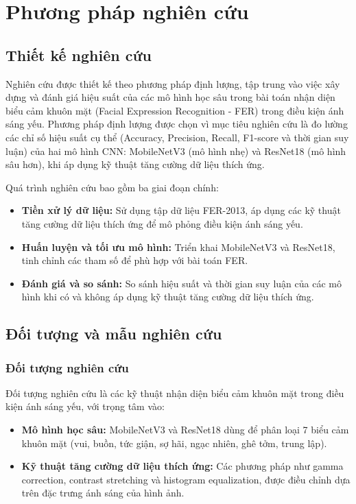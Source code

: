 \section{Phương pháp nghiên cứu} %

\subsection{Thiết kế nghiên cứu} %
Nghiên cứu được thiết kế theo phương pháp định lượng, tập trung vào việc xây dựng và đánh giá hiệu suất của các mô hình học sâu trong bài toán nhận diện biểu cảm khuôn mặt (Facial Expression Recognition - FER) trong điều kiện ánh sáng yếu. Phương pháp định lượng được chọn vì mục tiêu nghiên cứu là đo lường các chỉ số hiệu suất cụ thể (Accuracy, Precision, Recall, F1-score và thời gian suy luận) của hai mô hình CNN: MobileNetV3 (mô hình nhẹ) và ResNet18 (mô hình sâu hơn), khi áp dụng kỹ thuật tăng cường dữ liệu thích ứng.

Quá trình nghiên cứu bao gồm ba giai đoạn chính:
\begin{itemize}
    \item \textbf{Tiền xử lý dữ liệu:} Sử dụng tập dữ liệu FER-2013, áp dụng các kỹ thuật tăng cường dữ liệu thích ứng để mô phỏng điều kiện ánh sáng yếu.
    \item \textbf{Huấn luyện và tối ưu mô hình:} Triển khai MobileNetV3 và ResNet18, tinh chỉnh các tham số để phù hợp với bài toán FER.
    \item \textbf{Đánh giá và so sánh:} So sánh hiệu suất và thời gian suy luận của các mô hình khi có và không áp dụng kỹ thuật tăng cường dữ liệu thích ứng.
\end{itemize}

\subsection{Đối tượng và mẫu nghiên cứu} %
\subsubsection{Đối tượng nghiên cứu} %
Đối tượng nghiên cứu là các kỹ thuật nhận diện biểu cảm khuôn mặt trong điều kiện ánh sáng yếu, với trọng tâm vào:
\begin{itemize}
    \item \textbf{Mô hình học sâu:} MobileNetV3 và ResNet18 dùng để phân loại 7 biểu cảm khuôn mặt (vui, buồn, tức giận, sợ hãi, ngạc nhiên, ghê tởm, trung lập).
    \item \textbf{Kỹ thuật tăng cường dữ liệu thích ứng:} Các phương pháp như gamma correction, contrast stretching và histogram equalization, được điều chỉnh dựa trên đặc trưng ánh sáng của hình ảnh.
\end{itemize}

